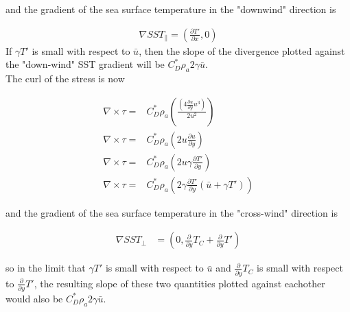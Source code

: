 \documentclass[12pt,a4paper]{article}
\newcommand{\dudy}{\frac{\partial u}{\partial y}}
\newcommand{\dTpdx}{\frac{\partial T'}{\partial x}}
\newcommand{\dTpdy}{\frac{\partial T'}{\partial y}}
\begin{document}
and the gradient of the sea surface temperature in the "downwind" direction is 

\begin{align*}
\nabla SST_{\parallel} = \left( \dTpdx, 0 \right)
\end{align*}
If $\gamma T'$ is small with respect to $\bar{u}$, then the slope of the divergence plotted against the "down-wind" SST gradient will be $C_D^*\rho_a 2\gamma\bar{u}$. \\

The curl of the stress is now

\begin{align*}
\nabla \times \tau =& C_D^* \rho_a \left( \frac{(4\dudy u^3 )}{2u^2} \right)\\
\nabla \times \tau =& C_D^* \rho_a \left(  2u\dudy \right)\\
\nabla \times \tau =& C_D^* \rho_a \left(  2u\gamma\dTpdy \right)\\
\nabla \times \tau =& C_D^* \rho_a \left( 2\gamma\dTpdy (\bar{u} + \gamma T') \right)
\end{align*}

and the gradient of the sea surface temperature in the "cross-wind" direction is 

\begin{align*}
\nabla SST_{\bot} &= \left(0 , \frac{\partial}{\partial y}T_C+ \frac{\partial}{\partial y}T' \right)
\end{align*}

so in the limit that  $\gamma T'$ is small with respect to $\bar{u}$ and $\frac{\partial}{\partial y}T_C$ is small with respect to $\frac{\partial}{\partial y}T'$, the resulting slope of these two quantities plotted against eachother would also be $C_D^* \rho_a 2\gamma\bar{u}$. \\




\end{document}
